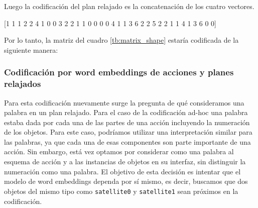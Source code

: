 Luego la codificación del plan relajado es la concatenación de los cuatro
vectores.

\begin{center}
    [1 1 1 2 2 4 1 0 0 3 2 2 1 1 0 0 0 0 4 1 1 3 6 2 2 5 2 2 1 1 4 1 3 6 0 0]
\end{center}

Por lo tanto, la matriz del cuadro \ref{tb:matrix_shape} estaría codificada de
la siguiente manera:

\begin{table}[h!]
\centering
{}
 \caption{Planes relajados y acciones etiquetadas usando codificación ad-hoc.}
 \label{tb:matrix_shape_ohe}
\end{table}

\subsubsection{Codificación por word embeddings de acciones y planes relajados}

Para esta codificación nuevamente surge la pregunta de qué consideramos una
palabra en un plan relajado. Para el caso de la codificación ad-hoc una palabra
estaba dada por cada una de las partes de una acción incluyendo la numeración de
los objetos. Para este caso, podríamos utilizar una interpretación similar para
las palabras, ya que cada una de esas componentes son parte importante de una
acción. Sin embargo, está vez optamos por considerar como una palabra al esquema
de acción y a las instancias de objetos en su interfaz, sin distinguir la
numeración como una palabra. El objetivo de esta decisión es intentar que el
modelo de word embeddings dependa por sí mismo, es decir, buscamos que dos
objetos del mismo tipo como \verb|satellite0| y \verb|satellite1| sean próximos
en la codificación.

